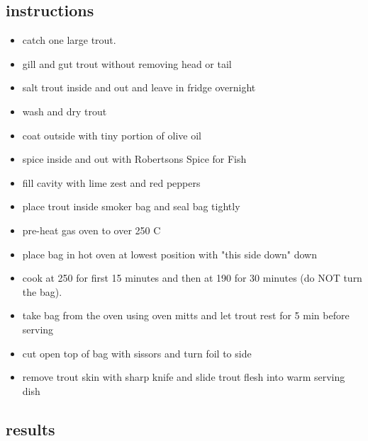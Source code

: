 \subsection*{instructions}
\begin{itemize}
\item catch one large trout.
\item gill and gut trout without removing head or tail
\item salt trout inside and out and leave in fridge overnight
\item wash and dry trout
\item coat outside with tiny portion of olive oil
\item spice inside and out with Robertsons Spice for Fish
\item fill cavity with lime zest and red peppers
\item place trout inside smoker bag and seal bag tightly
\item pre-heat gas oven to over 250 C
\item place bag in hot oven at lowest position with "this side down" down
\item cook at 250 for first 15 minutes and then at 190 for 30 minutes (do NOT turn the bag).
\item take bag from the oven using oven mitts and let trout rest for 5 min before serving
\item cut open top of bag with sissors and turn foil to side
\item remove trout skin with sharp knife and slide trout flesh into warm serving dish
\end{itemize}

\subsection*{results}
  
